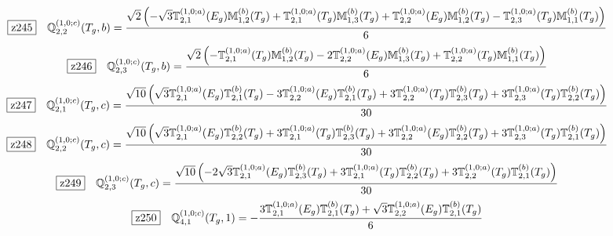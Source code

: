 \documentclass[fleqn,10pt,landscape]{jsarticle}
\begin{document}
\begin{dmath*}
\hspace*{3mm}\fbox{z245}\quad \mathbb{Q}_{2,2}^{(1,0;c)}(T_{g},b)=\frac{\sqrt{2} \left(- \sqrt{3} \mathbb{T}_{2,1}^{(1,0;a)}(E_{g}) \mathbb{M}_{1,2}^{(b)}(T_{g}) + \mathbb{T}_{2,1}^{(1,0;a)}(T_{g}) \mathbb{M}_{1,3}^{(b)}(T_{g}) + \mathbb{T}_{2,2}^{(1,0;a)}(E_{g}) \mathbb{M}_{1,2}^{(b)}(T_{g}) - \mathbb{T}_{2,3}^{(1,0;a)}(T_{g}) \mathbb{M}_{1,1}^{(b)}(T_{g})\right)}{6}
\end{dmath*}
\begin{dmath*}
\hspace*{3mm}\fbox{z246}\quad \mathbb{Q}_{2,3}^{(1,0;c)}(T_{g},b)=\frac{\sqrt{2} \left(- \mathbb{T}_{2,1}^{(1,0;a)}(T_{g}) \mathbb{M}_{1,2}^{(b)}(T_{g}) - 2 \mathbb{T}_{2,2}^{(1,0;a)}(E_{g}) \mathbb{M}_{1,3}^{(b)}(T_{g}) + \mathbb{T}_{2,2}^{(1,0;a)}(T_{g}) \mathbb{M}_{1,1}^{(b)}(T_{g})\right)}{6}
\end{dmath*}
\begin{dmath*}
\hspace*{3mm}\fbox{z247}\quad \mathbb{Q}_{2,1}^{(1,0;c)}(T_{g},c)=\frac{\sqrt{10} \left(\sqrt{3} \mathbb{T}_{2,1}^{(1,0;a)}(E_{g}) \mathbb{T}_{2,1}^{(b)}(T_{g}) - 3 \mathbb{T}_{2,2}^{(1,0;a)}(E_{g}) \mathbb{T}_{2,1}^{(b)}(T_{g}) + 3 \mathbb{T}_{2,2}^{(1,0;a)}(T_{g}) \mathbb{T}_{2,3}^{(b)}(T_{g}) + 3 \mathbb{T}_{2,3}^{(1,0;a)}(T_{g}) \mathbb{T}_{2,2}^{(b)}(T_{g})\right)}{30}
\end{dmath*}
\begin{dmath*}
\hspace*{3mm}\fbox{z248}\quad \mathbb{Q}_{2,2}^{(1,0;c)}(T_{g},c)=\frac{\sqrt{10} \left(\sqrt{3} \mathbb{T}_{2,1}^{(1,0;a)}(E_{g}) \mathbb{T}_{2,2}^{(b)}(T_{g}) + 3 \mathbb{T}_{2,1}^{(1,0;a)}(T_{g}) \mathbb{T}_{2,3}^{(b)}(T_{g}) + 3 \mathbb{T}_{2,2}^{(1,0;a)}(E_{g}) \mathbb{T}_{2,2}^{(b)}(T_{g}) + 3 \mathbb{T}_{2,3}^{(1,0;a)}(T_{g}) \mathbb{T}_{2,1}^{(b)}(T_{g})\right)}{30}
\end{dmath*}
\begin{dmath*}
\hspace*{3mm}\fbox{z249}\quad \mathbb{Q}_{2,3}^{(1,0;c)}(T_{g},c)=\frac{\sqrt{10} \left(- 2 \sqrt{3} \mathbb{T}_{2,1}^{(1,0;a)}(E_{g}) \mathbb{T}_{2,3}^{(b)}(T_{g}) + 3 \mathbb{T}_{2,1}^{(1,0;a)}(T_{g}) \mathbb{T}_{2,2}^{(b)}(T_{g}) + 3 \mathbb{T}_{2,2}^{(1,0;a)}(T_{g}) \mathbb{T}_{2,1}^{(b)}(T_{g})\right)}{30}
\end{dmath*}
\begin{dmath*}
\hspace*{3mm}\fbox{z250}\quad \mathbb{Q}_{4,1}^{(1,0;c)}(T_{g},1)=- \frac{3 \mathbb{T}_{2,1}^{(1,0;a)}(E_{g}) \mathbb{T}_{2,1}^{(b)}(T_{g}) + \sqrt{3} \mathbb{T}_{2,2}^{(1,0;a)}(E_{g}) \mathbb{T}_{2,1}^{(b)}(T_{g})}{6}
\end{dmath*}
\end{document}
